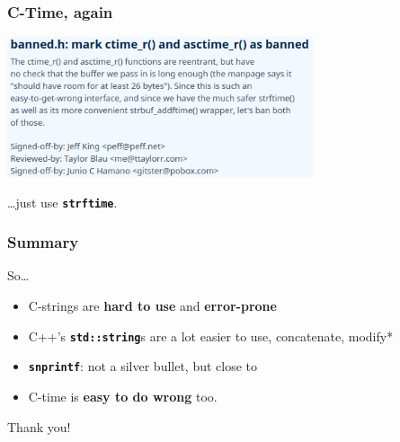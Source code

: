 \documentclass[aspectratio=169]{beamer}
\begin{document}
\begin{frame}
\frametitle{C-Time, again}
\begin{center}
\includegraphics[width=9cm,keepaspectratio]{pics/reentrant_ctime_functions_bad_too.png}
\end{center}
\par{}\vspace{2ex}
{\Large \dots{}just use \textbf{\texttt{strftime}}.}
\end{frame}


\begin{frame}
\frametitle{Summary}
{\huge So\dots}\par
\pause{}
\begin{itemize}[<+->]
  \item C-strings are \textbf{\textcolor{clRedFlag}{hard to use}} and \textbf{\textcolor{clRedFlag}{error-prone}}
  \item C++'s \texttt{\textbf{std::string}}s are a lot easier to use, concatenate, modify*
  \item \texttt{\textbf{snprintf}}: not a silver bullet, but close to
  \item C-time is \textbf{\textcolor{clRedFlag}{easy to do wrong}} too.
\end{itemize}
\vspace{4.5ex}
\begin{center}
\pause{}
{\huge Thank you!}
\end{center}
\end{frame}
\end{document}
